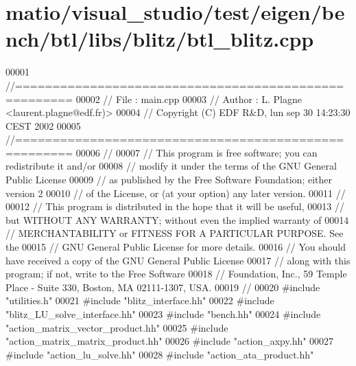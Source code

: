 \hypertarget{matio_2visual__studio_2test_2eigen_2bench_2btl_2libs_2blitz_2btl__blitz_8cpp_source}{}\section{matio/visual\+\_\+studio/test/eigen/bench/btl/libs/blitz/btl\+\_\+blitz.cpp}
\label{matio_2visual__studio_2test_2eigen_2bench_2btl_2libs_2blitz_2btl__blitz_8cpp_source}

\begin{DoxyCode}
00001 \textcolor{comment}{//=====================================================}
00002 \textcolor{comment}{// File   :  main.cpp}
00003 \textcolor{comment}{// Author :  L. Plagne <laurent.plagne@edf.fr)>}
00004 \textcolor{comment}{// Copyright (C) EDF R&D,  lun sep 30 14:23:30 CEST 2002}
00005 \textcolor{comment}{//=====================================================}
00006 \textcolor{comment}{//}
00007 \textcolor{comment}{// This program is free software; you can redistribute it and/or}
00008 \textcolor{comment}{// modify it under the terms of the GNU General Public License}
00009 \textcolor{comment}{// as published by the Free Software Foundation; either version 2}
00010 \textcolor{comment}{// of the License, or (at your option) any later version.}
00011 \textcolor{comment}{//}
00012 \textcolor{comment}{// This program is distributed in the hope that it will be useful,}
00013 \textcolor{comment}{// but WITHOUT ANY WARRANTY; without even the implied warranty of}
00014 \textcolor{comment}{// MERCHANTABILITY or FITNESS FOR A PARTICULAR PURPOSE.  See the}
00015 \textcolor{comment}{// GNU General Public License for more details.}
00016 \textcolor{comment}{// You should have received a copy of the GNU General Public License}
00017 \textcolor{comment}{// along with this program; if not, write to the Free Software}
00018 \textcolor{comment}{// Foundation, Inc., 59 Temple Place - Suite 330, Boston, MA  02111-1307, USA.}
00019 \textcolor{comment}{//}
00020 \textcolor{preprocessor}{#include "utilities.h"}
00021 \textcolor{preprocessor}{#include "blitz\_interface.hh"}
00022 \textcolor{preprocessor}{#include "blitz\_LU\_solve\_interface.hh"}
00023 \textcolor{preprocessor}{#include "bench.hh"}
00024 \textcolor{preprocessor}{#include "action\_matrix\_vector\_product.hh"}
00025 \textcolor{preprocessor}{#include "action\_matrix\_matrix\_product.hh"}
00026 \textcolor{preprocessor}{#include "action\_axpy.hh"}
00027 \textcolor{preprocessor}{#include "action\_lu\_solve.hh"}
00028 \textcolor{preprocessor}{#include "action\_ata\_product.hh"}

\end{DoxyCode}
